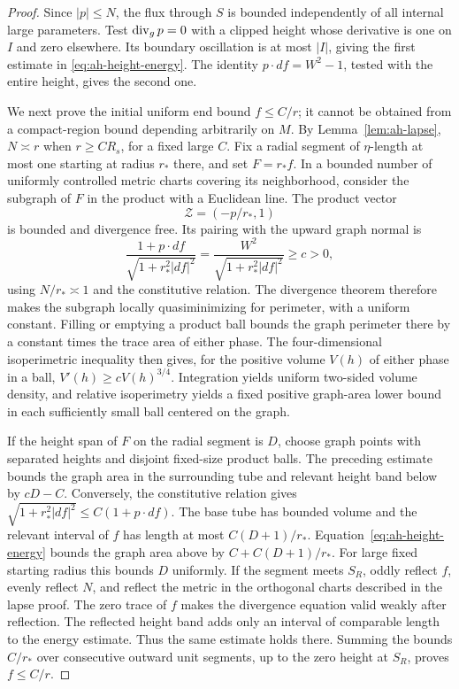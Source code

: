 \begin{proof}
Since \(|p|\le N\), the flux through \(S\) is bounded independently
of all internal large parameters.  Test \(\operatorname{div}_g p=0\) with
a clipped height whose derivative is one on \(I\) and zero
elsewhere.  Its boundary oscillation is at most \(|I|\), giving
the first estimate in \eqref{eq:ah-height-energy}.
The identity \(p\cdot df=W^2-1\), tested with the entire height,
gives the second one.

We next prove the initial uniform end bound \(f\le C/r\);
it cannot be obtained from a compact-region bound depending
arbitrarily on \(M\).  By Lemma~\ref{lem:ah-lapse}, \(N\asymp r\)
when \(r\ge CR_s\), for a fixed large \(C\).
Fix a radial segment of \(\eta\)-length at most one starting
at radius \(r_*\) there, and set \(F=r_*f\).  In a bounded
number of uniformly controlled metric charts covering its
neighborhood, consider the subgraph of \(F\) in the product
with a Euclidean line.  The product vector
\[
 \mathcal Z=(-p/r_*,1)
\]
is bounded and divergence free.  Its pairing with the upward
graph normal is
\[
 \frac{1+p\cdot df}{\sqrt{1+r_*^2|df|^2}}
 =\frac{W^2}{\sqrt{1+r_*^2|df|^2}}\ge c>0,
\]
using \(N/r_*\asymp1\) and the constitutive relation.
The divergence theorem therefore makes the subgraph locally
quasiminimizing for perimeter, with a uniform constant.
Filling or emptying a product ball bounds the graph perimeter
there by a constant times the trace area of either phase.
The four-dimensional isoperimetric inequality then gives,
for the positive volume \(V(h)\) of either phase in a ball,
\(V'(h)\ge cV(h)^{3/4}\).
Integration yields uniform two-sided volume density, and
relative isoperimetry yields a fixed positive graph-area
lower bound in each sufficiently small ball centered on
the graph.

If the height span of \(F\) on the radial segment is \(D\),
choose graph points with separated heights and disjoint
fixed-size product balls.  The preceding estimate bounds
the graph area in the surrounding tube and relevant height
band below by \(cD-C\).  Conversely, the constitutive relation
gives
\(\sqrt{1+r_*^2|df|^2}\le C(1+p\cdot df)\).
The base tube has bounded volume and the relevant interval
of \(f\) has length at most \(C(D+1)/r_*\).
Equation~\eqref{eq:ah-height-energy} bounds the graph area
above by \(C+C(D+1)/r_*\).  For large fixed starting radius
this bounds \(D\) uniformly.  If the segment meets \(S_R\),
oddly reflect \(f\), evenly reflect \(N\), and reflect the
metric in the orthogonal charts described in the lapse proof.
The zero trace of \(f\) makes the divergence equation valid
weakly after reflection.  The reflected height band adds
only an interval of comparable length to the energy estimate.
Thus the same estimate holds there.  Summing the bounds
\(C/r_*\) over consecutive outward unit segments, up to
the zero height at \(S_R\), proves \(f\le C/r\).


\end{proof}
